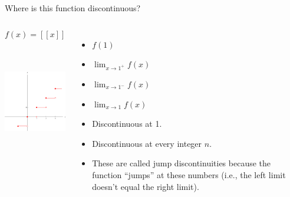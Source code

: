 \begin{frame}
\begin{example}[Example 2d, p. 114]
Where is this function discontinuous?
\begin{columns}[c]
\[
f(x) = [[x]]
\]
\ \includegraphics[height=4.5cm]{continuity/pictures/02-05-ex2d.pdf}%
\begin{itemize}
\item<2-| alert@3-4>  $f(1)$ 
\item<2-| alert@5-6>  $\lim_{x\rightarrow 1^+} f(x)$ 
\item<2-| alert@7-8>  $\lim_{x\rightarrow 1^-} f(x)$ 
\item<2-| alert@9-10>  $\lim_{x\rightarrow 1} f(x)$ 
\item<11->  Discontinuous at 1.
\item<12->  Discontinuous at every integer $n$.
\item<13->  These are called jump discontinuities because the function ``jumps'' at these numbers (i.e., the left limit doesn't equal the right limit).
\end{itemize}
\end{columns}
\end{example}
\end{frame}
